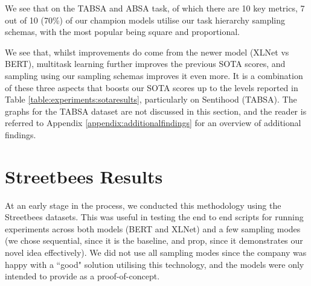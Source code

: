 We see that on the TABSA and ABSA task, of which there are 10 key metrics, 7 out of 10 (70\%) of our champion models utilise our task hierarchy sampling schemas, with the most popular being square and proportional.

We see that, whilst improvements do come from the newer model (XLNet vs BERT), multitask learning further improves the previous SOTA scores, and sampling using our sampling schemas improves it even more. It is a combination of these three aspects that boosts our SOTA scores up to the levels reported in Table \ref{table:experiments:sotaresults}, particularly on Sentihood (TABSA). The graphs for the TABSA dataset are not discussed in this section, and the reader is referred to Appendix \ref{appendix:additionalfindings} for an overview of additional findings.

\section{Streetbees Results}
At an early stage in the process, we conducted this methodology using the Streetbees datasets. This was useful in testing the end to end scripts for running experiments across both models (BERT and XLNet) and a few sampling modes (we chose sequential, since it is the baseline, and prop, since it demonstrates our novel idea effectively). We did not use all sampling modes since the company was happy with a ``good" solution utilising this technology, and the models were only intended to provide as a proof-of-concept.

